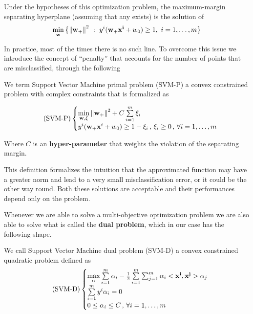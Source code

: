 \documentclass[computationalMathematics.tex]{subfiles}
\begin{document}

\noindent Under the hypotheses of this optimization problem, the maximum-margin separating hyperplane (assuming that any exists) is the solution of
\[
  \min\limits_{{\bf w }} \big\{{\left\lVert{\bf w }_+\right\rVert}^2~:~y^i( {\bf w }_+ {\bf x^i } + w_0 ) \geq 1, ~ i = 1, \ldots, m \big\}
\]
       
In practice, most of the times there is no such line. 
To overcome this issue we introduce the concept of ``penalty'' that accounts for the number of points that are misclassified, through the following

\begin{definition}
We term Support Vector Machine primal problem (SVM-P) a convex constrained problem with complex constraints that is formalized as

\begin{equation}
\tag{SVM-P}
\begin{cases}
\min\limits_{{\bf w },\xi}{{\left\lVert{\bf w }_+\right\rVert}^2 + C \sum\limits_{i=1}^m \xi_i}\\
y^i( {\bf w }_+ {\bf x }^i + w_0 ) \geq 1 - \xi_i \, , \, \xi_i \geq 0 \, ,  \, \forall i = 1, \ldots, m 
\end{cases}    
\end{equation}

Where $C$ is an \textbf{hyper-parameter} that weights the violation of the separating margin.
\end{definition}


This definition formalizes the intuition that the approximated function may have a greater norm and lead to a very small misclassification error, or it could be the other way round.
  Both these solutions are acceptable and their performances depend only on the problem.

Whenever we are able to solve a multi-objective optimization problem we are also able to solve what is called the \textbf{dual problem}, which in our case has the following shape.

\begin{definition}
	We call Support Vector Machine dual problem (SVM-D) a convex constrained quadratic problem defined as 
\begin{equation}
\tag{SVM-D}
\begin{cases}
	\max\limits_{\alpha} \sum\limits_{i=1}^m \alpha_i - \frac{1}{2} \sum\limits_{i=1}^m \sum_{j=1}^m \alpha_i <{\bf x^i }, {\bf x^j }> \alpha_j\\
	\sum\limits_{i=1}^m y^i \alpha_i = 0\\
	0 \leq \alpha_i \leq C \, , \,  \forall i = 1, \ldots, m
\end{cases}    
\end{equation}
\end{definition}
\end{document}
